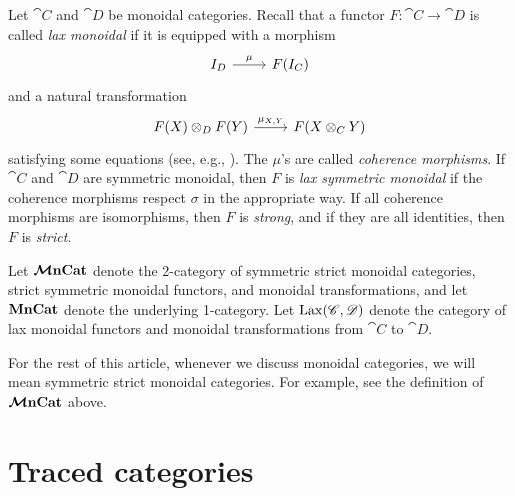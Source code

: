 \documentclass[11pt,oneside,article]{memoir}
\begin{document}
Let $\cat{C}$ and $\cat{D}$ be monoidal categories. Recall that a functor
$F\colon\cat{C}\to\cat{D}$ is called \emph{lax monoidal} if it is equipped with a morphism
\[
\begin{tikzcd}
   I_D \rar{\mu} & F(I_C)
\end{tikzcd}
\]
and a natural transformation
\[
\begin{tikzcd}
   F(X) \otimes_D F(Y) \rar{\mu_{X,Y}} & F(X\otimes_C Y)
\end{tikzcd}
\]
satisfying some equations (see, e.g., \cite{Leinster,BorceuxV2}). The $\mu$'s are called \emph{coherence morphisms}. If $\cat{C}$ and $\cat{D}$ are symmetric monoidal, then $F$ is
\emph{lax symmetric monoidal} if the coherence morphisms respect $\sigma$ in the appropriate way. If all coherence morphisms
are isomorphisms, then $F$ is \emph{strong}, and if they are all
identities, then $F$ is \emph{strict}.

Let $\bm{\mathcal{M}}\mathbf{nCat}$ denote the 2-category of symmetric strict monoidal categories, strict symmetric
monoidal functors, and monoidal transformations, and let $\mathbf{MnCat}$ denote the underlying 1-category.
Let $\operatorname{Lax}(\mathscr{C},\mathscr{D})$ denote the category of lax monoidal functors and monoidal
transformations from $\cat{C}$ to $\cat{D}$.

\begin{warning}\label{warn:symmetric}
   For the rest of this article, whenever we discuss monoidal categories, we will mean symmetric
   strict monoidal categories. For example, see the definition of $\bm{\mathcal{M}}\mathbf{nCat}$ above.
\end{warning}

\section{Traced categories}\label{sec:intuition_for_traced}
\end{document}
